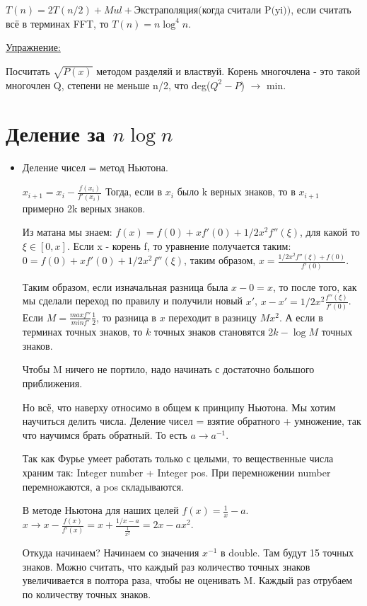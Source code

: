 $T(n) = 2T(n/2) + Mul + \text{Экстраполяция(когда считали P(yi))}$, если считать всё в терминах FFT, то $T(n) = n \log^4 n$.

\underline{Упражнение:}

Посчитать $\sqrt{P(x)}$ методом разделяй и властвуй. Корень многочлена - это такой многочлен Q, степени не меньше n/2, что deg($Q^2 - P$) $\rightarrow$ min.

\section{Деление за \texorpdfstring{$n\log n$}{n log n}}

\begin{itemize}
    \item Деление чисел = метод Ньютона.
    
    $x_{i + 1} = x_i - \frac{f(x_i)}{f'(x_i)}$ Тогда, если в $x_i$ было k верных знаков, то в $x_{i + 1}$ примерно 2k верных знаков.
    
    Из матана мы знаем: $f(x) = f(0) + xf'(0) + 1/2x^2f''(\xi)$, для какой то $\xi \in [0, x]$. Если x - корень f, то уравнение получается таким: $0 = f(0) + xf'(0) + 1/2x^2f''(\xi)$, таким образом, $x = \frac{1/2x^2f''(\xi) + f(0)}{f'(0)}$.
    
    Таким образом, если изначальная разница была $x - 0 = x$, то после того, как мы сделали переход по правилу и получили новый $x'$, $x - x' = 1/2x^2\frac{f''(\xi)}{f'(0)}$. Если $M = \frac{max f''}{min f'}\frac{1}{2}$, то разница в $x$ переходит в разницу $Mx^2$. А если в терминах точных знаков, то $k$ точных знаков становятся $2k - \log M$ точных знаков. 
    
    Чтобы M ничего не портило, надо начинать с достаточно большого приближения.
    
    Но всё, что наверху относимо в общем к принципу Ньютона. Мы хотим научиться делить числа. Деление чисел = взятие обратного + умножение, так что научимся брать обратный. То есть $a \rightarrow a^{-1}$.
    
    Так как Фурье умеет работать только с целыми, то вещественные числа храним так: Integer number + Integer pos. При перемножении number перемножаются, а pos складываются.
    
    В методе Ньютона для наших целей $f(x) = \frac{1}{x} - a$. $x \rightarrow x - \frac{f(x)}{f'(x)} = x + \frac{1/x - a}{\frac{1}{x^2}} = 2x - ax^2$.
    
    Откуда начинаем? Начинаем со значения $x^{-1}$ в double. Там будут 15 точных знаков. Можно считать, что каждый раз количество точных знаков увеличивается в полтора раза, чтобы не оценивать M. Каждый раз отрубаем по количеству точных знаков.
    

\end{itemize}

